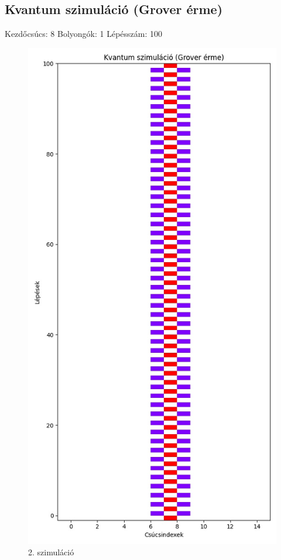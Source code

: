 \documentclass[14pt,a4paper]{article}
\begin{document}
\subsection{Kvantum szimuláció (Grover érme)}
Kezdőcsúcs: 8
Bolyongók: 1
Lépésszám: 100
\begin{figure}[H]
\centering
\includegraphics[width = 0.7\columnwidth]{sim_02/counts.jpg}
\caption{2. szimuláció}
\end{figure}
\end{document}
